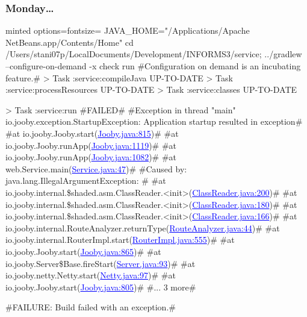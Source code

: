 \documentclass[nochapters]{otagoslides}
\begin{document}
\begin{frame}[fragile]
    \frametitle{Monday\ldots}
    \begin{tcblisting}{minted options={fontsize=\fontsize{6pt}{7pt}\selectfont}}
        JAVA_HOME="/Applications/Apache NetBeans.app/Contents/Home"
        cd /Users/stani07p/LocalDocuments/Development/INFORMS3/service; ../gradlew --configure-on-demand -x check run
        #\color{gray}Configuration on demand is an incubating feature.#
        > Task :service:compileJava UP-TO-DATE
        > Task :service:processResources UP-TO-DATE
        > Task :service:classes UP-TO-DATE

        > Task :service:run #\textcolor{red!65!black}{FAILED}#
        #\textcolor{red!65!black}{Exception in thread "main" io.jooby.exception.StartupException: Application startup resulted in exception}#
                #\textcolor{red!65!black}{at io.jooby.Jooby.start}(\textcolor{blue}{\uline{Jooby.java:815}})#
                #\textcolor{red!65!black}{at io.jooby.Jooby.runApp}(\textcolor{blue}{\uline{Jooby.java:1119}})#
                #\textcolor{red!65!black}{at io.jooby.Jooby.runApp}(\textcolor{blue}{\uline{Jooby.java:1082}})#
                #\textcolor{red!65!black}{at web.Service.main}(\textcolor{blue}{\uline{Service.java:47}})#
        #\textcolor{red!65!black}{Caused by: java.lang.IllegalArgumentException: }#
                #\textcolor{red!65!black}{at io.jooby.internal.\$shaded.asm.ClassReader.<init>}(\textcolor{blue}{\uline{ClassReader.java:200}})#
                #\textcolor{red!65!black}{at io.jooby.internal.\$shaded.asm.ClassReader.<init>}(\textcolor{blue}{\uline{ClassReader.java:180}})#
                #\textcolor{red!65!black}{at io.jooby.internal.\$shaded.asm.ClassReader.<init>}(\textcolor{blue}{\uline{ClassReader.java:166}})#
                #\textcolor{red!65!black}{at io.jooby.internal.RouteAnalyzer.returnType}(\textcolor{blue}{\uline{RouteAnalyzer.java:44}})#
                #\textcolor{red!65!black}{at io.jooby.internal.RouterImpl.start}(\textcolor{blue}{\uline{RouterImpl.java:555}})#
                #\textcolor{red!65!black}{at io.jooby.Jooby.start}(\textcolor{blue}{\uline{Jooby.java:865}})#
                #\textcolor{red!65!black}{at io.jooby.Server\$Base.fireStart}(\textcolor{blue}{\uline{Server.java:93}})#
                #\textcolor{red!65!black}{at io.jooby.netty.Netty.start}(\textcolor{blue}{\uline{Netty.java:97}})#
                #\textcolor{red!65!black}{at io.jooby.Jooby.start}(\textcolor{blue}{\uline{Jooby.java:805}})#
                #\textcolor{red!65!black}{... 3 more}#

        #\textcolor{red!65!black}{FAILURE: Build failed with an exception.}#
    \end{tcblisting}
\end{frame}
\end{document}
